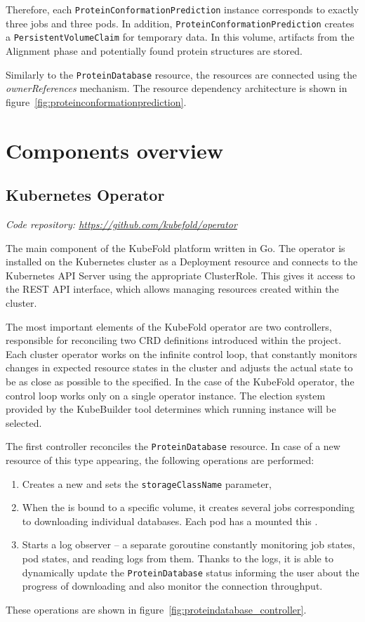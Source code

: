 Therefore, each \texttt{ProteinConformationPrediction} instance corresponds to exactly three jobs and three pods.
In addition, \texttt{ProteinConformationPrediction} creates a \texttt{PersistentVolumeClaim} for temporary data.
In this volume, artifacts from the Alignment phase and potentially found protein structures are stored.

Similarly to the \texttt{ProteinDatabase} resource, the resources are connected using the \textit{ownerReferences} mechanism.
The resource dependency architecture is shown in figure~\ref{fig:proteinconformationprediction}.


\section{Components overview}

\subsection{Kubernetes Operator}\label{subsec:component-operator}
\textit{Code repository: \url{https://github.com/kubefold/operator}}

The main component of the KubeFold platform written in Go.
The operator is installed on the Kubernetes cluster as a Deployment resource and connects to the Kubernetes API Server using the appropriate ClusterRole.
This gives it access to the REST API interface, which allows managing resources created within the cluster.

The most important elements of the KubeFold operator are two controllers, responsible for reconciling two CRD definitions introduced within the project.
Each cluster operator works on the infinite control loop, that constantly monitors changes in expected resource states in the cluster and adjusts the actual state to be as close as possible to the specified.
In the case of the KubeFold operator, the control loop works only on a single operator instance.
The election system provided by the KubeBuilder tool determines which running instance will be selected.

The first controller reconciles the \texttt{ProteinDatabase} resource.
In case of a new resource of this type appearing, the following operations are performed:
\begin{enumerate}
    \item Creates a new  and sets the \texttt{storageClassName} parameter,
    \item When the  is bound to a specific volume, it creates several jobs corresponding to downloading individual databases.
    Each pod has a mounted this .
    \item Starts a log observer -- a separate goroutine constantly monitoring job states, pod states, and reading logs from them.
    Thanks to the logs, it is able to dynamically update the \texttt{ProteinDatabase} status informing the user about the progress of downloading and also monitor the connection throughput.
\end{enumerate}
These operations are shown in figure~\ref{fig:proteindatabase_controller}.

